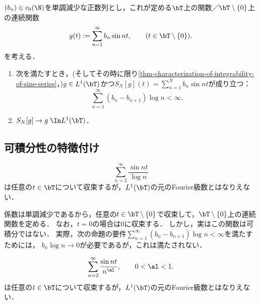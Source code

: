 \documentclass[uplatex,dvipdfmx]{jsreport}
\begin{document}
\begin{theorem}
    $(b_n)\in c_0(\N)$を単調減少な正数列とし，これが定める$\bT$上の関数／$\bT\setminus\{0\}$上の連続関数
    \[g(t):=\sum_{n=1}^\infty b_n\sin nt,\qquad (t\in\bT\setminus\{0\}).\]
    を考える．
    \begin{enumerate}
        \item 次を満たすとき，(そしてその時に限り\ref{thm-characterization-of-integrability-of-sine-series}，)$g\in L^1(\bT)$かつ$S_N[g](t)=\sum_{n=1}^Nb_n\sin nt$が成り立つ：
        \[\sum_{n=1}^\infty(b_n-b_{n+1})\log n<\infty.\]
        \item $S_N[g]\to g\;\In L^1(\bT)$．
    \end{enumerate}
\end{theorem}

\subsection{可積分性の特徴付け}

\begin{proposition}
    \[\sum_{n=2}^\infty\frac{\sin nt}{\log n}\]
    は任意の$t\in\bT$について収束するが，$L^1(\bT)$の元のFourier級数とはなりえない．
\end{proposition}
\begin{Proof}
    係数は単調減少であるから，任意の$t\in\bT\setminus\{0\}$で収束して，$\bT\setminus\{0\}$上の連続関数を定める．
    なお，$t=0$の場合は$0$に収束する．
    しかし，実はこの関数は可積分ではない．
    実際，次の命題の要件$\sum_{n=1}^\infty(b_n-b_{n+1})\log n<\infty$を満たすためには，
    $b_n\log n\to0$が必要であるが，これは満たされない．
\end{Proof}

\begin{proposition}
    \[\sum_{n=2}^\infty\frac{\sin nt}{n^\al},\qquad 0<\al<1.\]
    は任意の$t\in\bT$について収束するが，$L^1(\bT)$の元のFourier級数とはなりえない．
\end{proposition}
\end{document}
